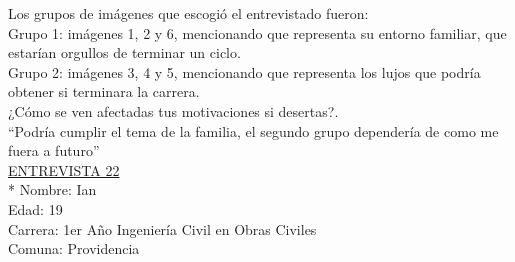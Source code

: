 Los grupos de imágenes que escogió el entrevistado fueron:\\

Grupo 1: imágenes 1, 2 y 6, mencionando que representa su entorno familiar, que estarían orgullos de terminar un ciclo. \\

Grupo 2: imágenes 3, 4 y 5, mencionando que representa los lujos que podría obtener si terminara la carrera.\\


¿Cómo se ven afectadas tus motivaciones si desertas?.\\

``Podría cumplir el tema de la familia, el segundo grupo dependería de como me fuera a futuro''\\


\underline {ENTREVISTA 22}\\*
Nombre: Ian \\
Edad: 19\\
Carrera: 1er Año Ingeniería Civil en Obras Civiles \\
Comuna: Providencia\\

